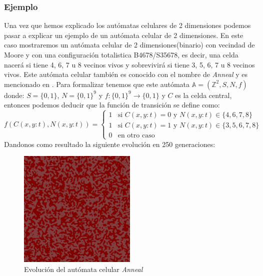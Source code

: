 \subsubsection{Ejemplo}
    Una vez que hemos explicado los aut\'omatas celulares de 2 dimensiones podemos pasar a explicar un ejemplo de un aut\'omata celular de 2 dimensiones.
    \vskip 0.5cm
    En este caso mostraremos un aut\'omata celular de 2 dimensiones(binario) con vecindad de Moore y con una configuraci\'on totalistica 
        B4678/S35678, es decir, una celda nacer\'a si tiene 4, 6, 7 u 8 vecinos vivos y sobrevivir\'a si tiene 3, 5, 6, 7 u 8 vecinos vivos.
        Este aut\'omata celular tambi\'en es conocido con el nombre de \textit{Anneal} y es mencionado en \cite{Toffoli1987}.
    \vskip 0.5cm
    Para formalizar tenemos que este aut\'omata $\mathbb{A} = (\mathbb{Z}^2, S, N, f)$ donde: 
        $S = \{0,1\}$, $N = \{0,1\}^9$ y $f: \{0,1\}^9 \rightarrow \{0,1\}$ y $C$ es la celda central, 
        entonces podemos deducir que la funci\'on de transici\'on se define como:
        \begin{equation*}
            f(C(x,y:t),N(x,y:t)) = \begin{cases}
                1 & \text{si } C(x,y:t) = 0 \text{ y } N(x,y:t) \in \{4,6,7,8\} \\
                1 & \text{si } C(x,y:t) = 1 \text{ y } N(x,y:t) \in \{3,5,6,7,8\} \\
                0 & \text{en otro caso}
            \end{cases}
        \end{equation*}
    \vskip 0.5cm
    Dandonos como resultado la siguiente evoluci\'on en 250 generaciones:
    \begin{figure}[h]
        \centering
        \includegraphics[width=0.5\textwidth]{./images/marco_teorico/automatas_celulares/Anneal.png}
        \caption{Evoluci\'on del aut\'omata celular \textit{Anneal}}
        \label{fig:anneal}
    \end{figure}
    \clearpage